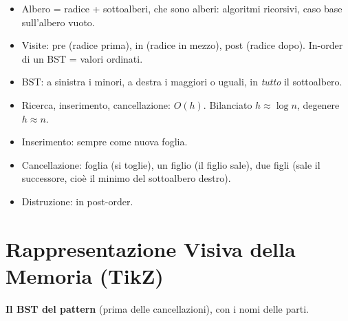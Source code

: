 \begin{inparole}
\begin{itemize}
  \item Albero = radice + sottoalberi, che sono alberi: algoritmi ricorsivi, caso base
        sull'albero vuoto.
  \item Visite: pre (radice prima), in (radice in mezzo), post (radice dopo). In-order di
        un BST = valori ordinati.
  \item BST: a sinistra i minori, a destra i maggiori o uguali, in \emph{tutto} il sottoalbero.
  \item Ricerca, inserimento, cancellazione: $O(h)$. Bilanciato $h \approx \log n$,
        degenere $h \approx n$.
  \item Inserimento: sempre come nuova foglia.
  \item Cancellazione: foglia (si toglie), un figlio (il figlio sale), due figli (sale il
        successore, cioè il minimo del sottoalbero destro).
  \item Distruzione: in post-order.
\end{itemize}
\end{inparole}

\section{Rappresentazione Visiva della Memoria (TikZ)}

\textbf{Il BST del pattern} (prima delle cancellazioni), con i nomi delle parti.
\begin{center}
\end{center}

